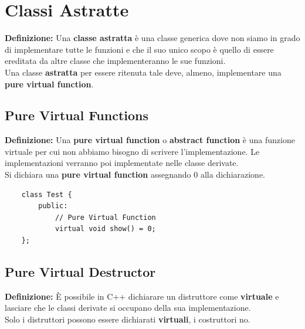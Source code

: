 
\newpage

\section{Classi Astratte}

\textsf{\small \textbf{Definizione: } Una \textbf{classe astratta} è una classe generica dove non siamo in grado di implementare tutte le funzioni e che il suo unico scopo è quello di essere ereditata da altre classe che implementeranno le sue funzioni.} \\

\textsf{\small Una classe \textbf{astratta} per essere ritenuta tale deve, almeno, implementare una \textbf{pure virtual function}.} \\

\subsection{Pure Virtual Functions}

\textsf{\small \textbf{Definizione: } Una \textbf{pure virtual function} o \textbf{abstract function} è una funzione virtuale per cui non abbiamo bisogno di scrivere l'implementazione. Le implementazioni verranno poi implementate nelle classe derivate.} \\

\textsf{\small Si dichiara una \textbf{pure virtual function} assegnando 0 alla dichiarazione.} \\

\begin{lstlisting}
	class Test {
		public:
			// Pure Virtual Function
			virtual void show() = 0;
	};
\end{lstlisting}

\subsection{Pure Virtual Destructor} %

\textsf{\small \textbf{Definizione: } È possibile in C++ dichiarare un distruttore come \textbf{virtuale} e lasciare che le classi derivate si occupano della sua implementazione.} \\

\textsf{\small Solo i distruttori possono essere dichiarati \textbf{virtuali}, i costruttori no.} \\

